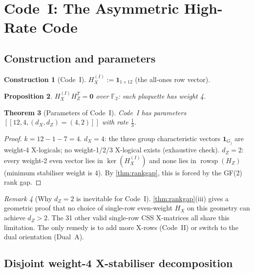 \documentclass[12pt,a4paper]{article}
\theoremstyle{plain}
\newtheorem{theorem}{Theorem}[section]
\newtheorem{proposition}[theorem]{Proposition}
\theoremstyle{definition}
\newtheorem{construction}[theorem]{Construction}
\theoremstyle{remark}
\newtheorem{remark}[theorem]{Remark}
\newcommand{\GFtwo}{\mathbb{F}_2}
\newcommand{\HZ}{H_Z}
\newcommand{\rowsp}{\operatorname{rowsp}}
\begin{document}
\section{Code~I: The Asymmetric High-Rate Code}\label{sec:codeI}

\subsection{Construction and parameters}

\begin{construction}[Code~I]\label{con:codeI}
$H_X^{(I)} := \bm{1}_{1\times12}$ (the all-ones row vector).
\end{construction}

\begin{proposition}
$H_X^{(I)} H_Z^T = \bm{0}$ over $\GFtwo$: each plaquette has weight 4.
\end{proposition}

\begin{theorem}[Parameters of Code~I]\label{thm:codeI}
Code~I has parameters $[[12, 4, (d_X,d_Z)=(4,2)]]$ with rate $\tfrac{1}{3}$.
\end{theorem}
\begin{proof}
$k = 12 - 1 - 7 = 4$.
$d_X = 4$: the three group characteristic vectors $\bm{1}_{G_j}$ are
weight-4 X-logicals; no weight-1/2/3 X-logical exists (exhaustive check).
$d_Z = 2$: every weight-2 even vector lies in $\ker(H_X^{(I)})$ and
none lies in $\rowsp(\HZ)$ (minimum stabiliser weight is 4).
By \cref{thm:rankgap}, this is forced by the GF(2) rank gap.
\end{proof}

\begin{remark}[Why $d_Z = 2$ is inevitable for Code~I]
\cref{thm:rankgap}(iii) gives a geometric proof that no choice of
single-row even-weight $H_X$ on this geometry can achieve $d_Z > 2$.
The 31 other valid single-row CSS X-matrices all share this limitation.
The only remedy is to add more X-rows (Code~II) or switch to the dual
orientation (Dual~A).
\end{remark}

\subsection{Disjoint weight-4 X-stabiliser decomposition}\label{sec:xstab_A}
\end{document}
